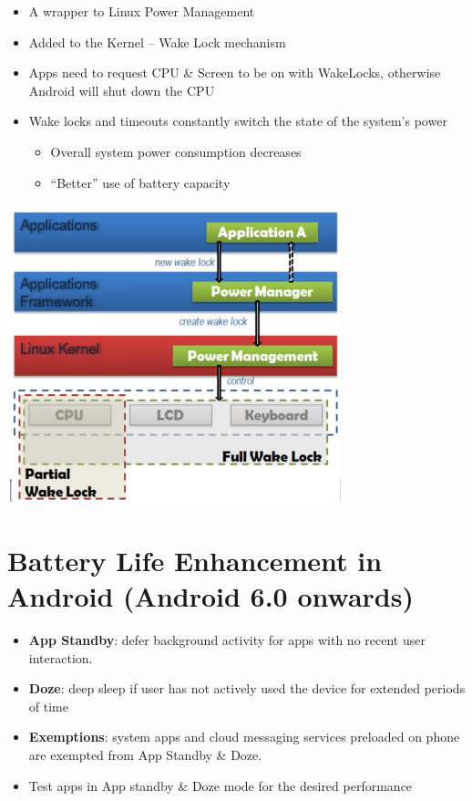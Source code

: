 \documentclass{article}
\begin{document}
\begin{multicols}{2}

\begin{itemize}
  \item A wrapper to Linux Power Management 
  \item Added to the Kernel – Wake Lock mechanism 
  \item Apps need to request CPU \& Screen to be on with WakeLocks, otherwise Android will shut down the CPU 
  \item Wake locks and timeouts constantly switch the state of the system’s power
  \begin{itemize}
    \item Overall system power consumption decreases
    \item “Better” use of battery capacity
  \end{itemize}
\end{itemize}

\vfill\null

\begin{center}
  \includegraphics[scale=0.5]{power_architecture.png}
\end{center}

\end{multicols}

\section{Battery Life Enhancement in Android (Android 6.0 onwards)}

\begin{itemize}
  \item \textbf{App Standby}: defer background activity for apps with no recent user interaction. 
  \item \textbf{Doze}: deep sleep if user has not actively used the device for extended periods of time 
  \item \textbf{Exemptions}: system apps and cloud messaging services preloaded on phone are exempted from App Standby \& Doze. 
  \item Test apps in App standby \& Doze mode for the desired performance
\end{itemize}
\end{document}
